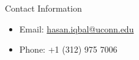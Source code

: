 \documentclass[final]{beamer}
\newlength{\onecolwid}
\begin{document}
\begin{frame}[t]
\begin{columns}[t]
\begin{column}{\onecolwid}
\vspace{-.9in}
\begin{alertblock}{Contact Information}

\begin{itemize}
\item Email: \href{mailto:hasan.iqbal@uconn.edu}{hasan.iqbal@uconn.edu}
\item Phone: +1 (312) 975 7006
\end{itemize}

\end{alertblock}



\end{column} %

\end{columns} %

\end{frame} %
\end{document}
